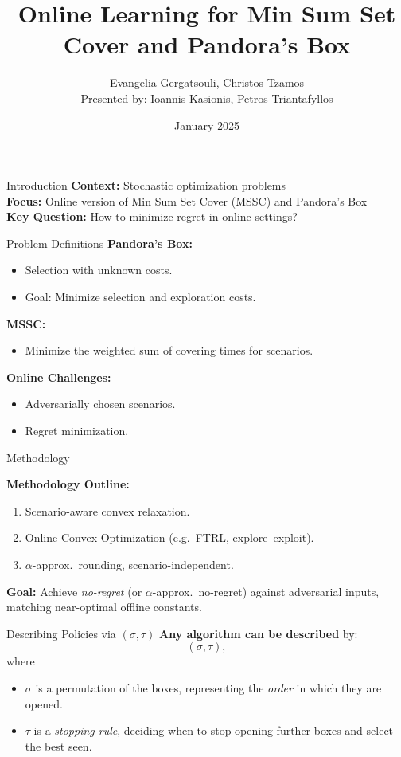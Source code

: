 \documentclass{beamer}
\title[Online Learning]{Online Learning for Min Sum Set Cover and Pandora's Box}
\author{Evangelia Gergatsouli, Christos Tzamos \\ Presented by: Ioannis Kasionis, Petros Triantafyllos}
\date{January 2025}
\begin{document}
\begin{frame}
  \titlepage
\end{frame}

\begin{frame}{Introduction}
\textbf{Context:} Stochastic optimization problems\\
\textbf{Focus:} Online version of Min Sum Set Cover (MSSC) and Pandora's Box\\
\textbf{Key Question:} How to minimize regret in online settings?
\end{frame}

\begin{frame}{Problem Definitions}
\textbf{Pandora’s Box:}
\begin{itemize}
    \item Selection with unknown costs.
    \item Goal: Minimize selection and exploration costs.
\end{itemize}
\textbf{MSSC:}
\begin{itemize}
    \item Minimize the weighted sum of covering times for scenarios.
\end{itemize}
\textbf{Online Challenges:}
\begin{itemize}
    \item Adversarially chosen scenarios.
    \item Regret minimization.
\end{itemize}
\end{frame}

\begin{frame}{Methodology}

    \textbf{Methodology Outline:}
    \begin{enumerate}
        \item Scenario-aware convex relaxation.
        \item Online Convex Optimization (e.g.\ FTRL, explore--exploit).
        \item $\alpha$-approx.\ rounding, scenario-independent.
    \end{enumerate}
    
    \textbf{Goal:} Achieve \emph{no-regret} (or $\alpha$-approx.\ no-regret) against adversarial inputs, matching near-optimal offline constants.
    \end{frame}
    
    \begin{frame}{Describing Policies via $(\sigma, \tau)$}
    \textbf{Any algorithm can be described} by:
    \[
      (\sigma, \tau),
    \]
    where
    \begin{itemize}
      \item $\sigma$ is a permutation of the boxes, representing the \emph{order} in which they are opened.
      \item $\tau$ is a \emph{stopping rule}, deciding when to stop opening further boxes and select the best seen.
    \end{itemize}
    
    \end{frame}
    
\end{document}
